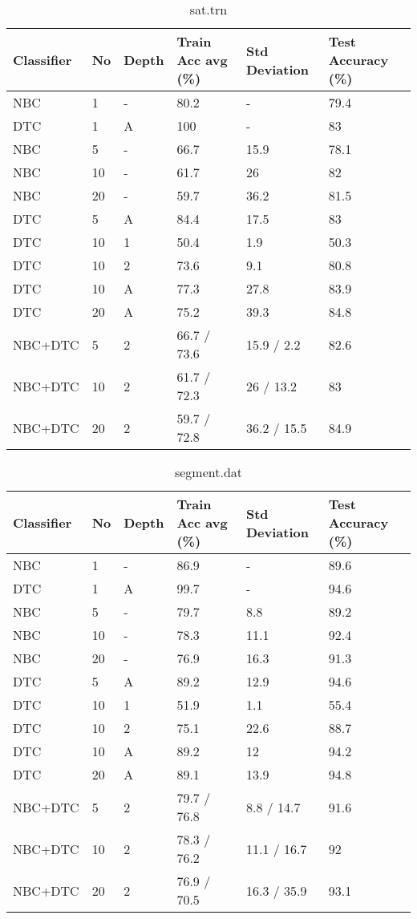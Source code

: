\begin{table}[h]
	\centering
	\begin{tabular}[h]{l|l|l|l|l|l}
		Classifier & No & Depth & Train Acc avg (\%) & Std Deviation & Test Accuracy (\%)\\
		\hline
		NBC & 1 & - & 80.2 & - & 79.4 \\
		DTC & 1 & A & 100 & - & 83 \\
		NBC & 5 & - & 66.7 & 15.9 & 78.1 \\
		NBC & 10 & - & 61.7 & 26 & 82 \\
		NBC & 20 & - & 59.7 & 36.2 & 81.5 \\
		DTC & 5 & A & 84.4 & 17.5 & 83 \\
		DTC & 10 & 1 & 50.4 & 1.9 & 50.3 \\
		DTC & 10 & 2 & 73.6 & 9.1 & 80.8 \\
		DTC & 10 & A & 77.3 & 27.8 & 83.9 \\
		DTC & 20 & A & 75.2 & 39.3 & 84.8 \\
		NBC+DTC & 5 & 2 & 66.7 / 73.6 & 15.9 / 2.2 & 82.6 \\
		NBC+DTC & 10 & 2 & 61.7 / 72.3 & 26 / 13.2 & 83 \\
		NBC+DTC & 20 & 2 & 59.7 / 72.8 & 36.2 / 15.5 & 84.9 \\
	\end{tabular}
	\caption{sat.trn}
\end{table}

\begin{table}[h]
	\centering
	\begin{tabular}[h]{l|l|l|l|l|l}
		Classifier & No & Depth & Train Acc avg (\%) & Std Deviation & Test Accuracy (\%)\\
		\hline
		NBC & 1 & -  & 86.9 & - & 89.6 \\
		DTC & 1 & A  & 99.7 & - & 94.6 \\
		NBC & 5 & -  & 79.7 & 8.8 & 89.2 \\
		NBC & 10 & -  & 78.3 & 11.1 & 92.4 \\
		NBC & 20 & -  & 76.9 & 16.3 & 91.3 \\
		DTC & 5 &  A & 89.2 & 12.9 & 94.6 \\
		DTC & 10 & 1  & 51.9 & 1.1 & 55.4 \\
		DTC & 10 & 2  & 75.1 & 22.6 & 88.7 \\
		DTC & 10 &  A & 89.2 & 12 & 94.2 \\
		DTC & 20 &  A & 89.1 & 13.9 & 94.8 \\
		NBC+DTC & 5 & 2  & 79.7 / 76.8 & 8.8 / 14.7 & 91.6 \\
		NBC+DTC & 10 & 2  & 78.3 / 76.2 & 11.1 / 16.7 & 92 \\
		NBC+DTC & 20 & 2  & 76.9 / 70.5 & 16.3 / 35.9 & 93.1 \\
	\end{tabular}
	\caption{segment.dat}
	\label{tab:segment}
\end{table}

